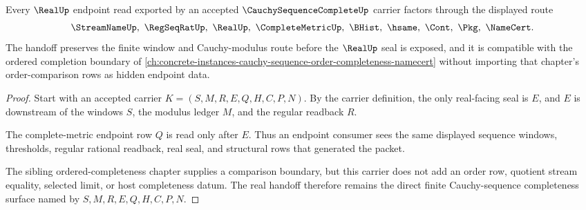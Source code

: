\begin{theorem}
\label{thm:cauchy-sequence-complete-real-handoff}
Every $\RealUp$ endpoint read exported by an accepted $\CauchySequenceCompleteUp$ carrier factors through the displayed route
$$
\StreamNameUp,\ \RegSeqRatUp,\ \RealUp,\ \CompleteMetricUp,\ \BHist,\ \hsame,\ \Cont,\ \Pkg,\ \NameCert .
$$
The handoff preserves the finite window and Cauchy-modulus route before the $\RealUp$ seal is exposed, and it is compatible with the ordered completion boundary of \autoref{ch:concrete-instances-cauchy-sequence-order-completeness-namecert} without importing that chapter's order-comparison rows as hidden endpoint data.
\end{theorem}
\begin{proof}
Start with an accepted carrier $K=(S,M,R,E,Q,H,C,P,N)$. By the carrier definition, the only real-facing seal is $E$, and $E$ is downstream of the windows $S$, the modulus ledger $M$, and the regular readback $R$.

The complete-metric endpoint row $Q$ is read only after $E$. Thus an endpoint consumer sees the same displayed sequence windows, thresholds, regular rational readback, real seal, and structural rows that generated the packet.

The sibling ordered-completeness chapter supplies a comparison boundary, but this carrier does not add an order row, quotient stream equality, selected limit, or host completeness datum. The real handoff therefore remains the direct finite Cauchy-sequence completeness surface named by $S,M,R,E,Q,H,C,P,N$.
\end{proof}




